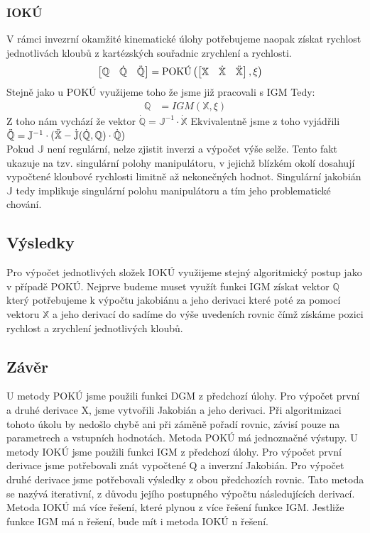 \documentclass{article}
\begin{document}
			\subsubsection{IOKÚ}
				V rámci invezrní okamžité kinematické úlohy potřebujeme naopak získat rychlost jednotlivách kloubů z kartézských souřadnic zrychlení a rychlosti. 
					\begin{align}
							\begin{bmatrix}
								\mathbb{Q} & \dot{\mathbb{Q}} & \Ddot{\mathbb{Q}} \\
							\end{bmatrix} &= \textnormal{POKÚ}\left( \begin{bmatrix}
								\mathbb{X} & \dot{\mathbb{X}} & \Ddot{\mathbb{X}} \\
							\end{bmatrix}, \xi \right)
					\end{align}
				Stejně jako u POKÚ využijeme toho že jsme již pracovali s IGM Tedy:
					\begin{align}
					\mathbb{Q} &= IGM(\mathbb{X},\xi)
					\end{align}
				Z toho nám vychází že vektor $\mathbb{\dot{Q}} = \mathbb{J}^{-1}\cdot\mathbb{\dot{X}}$ 
				Ekvivalentně jsme z toho vyjádřili $\mathbb{\Ddot{Q}} = \mathbb{J}^{-1}\cdot(\mathbb{\Ddot{X}}-\mathbb{\dot{J}}(\mathbb{\dot{Q}},\mathbb{Q})\cdot\mathbb{\dot{Q}})$\\
				Pokud \(\mathbb{J}\) není regulární, nelze zjistit inverzi a výpočet výše selže. Tento fakt ukazuje na tzv. singulární polohy manipulátoru, v jejichž blízkém okolí dosahují vypočtené kloubové rychlosti limitně až nekonečných hodnot. Singulární jakobián \(\mathbb{J}\) tedy implikuje singulární polohu manipulátoru a tím jeho problematické chování.
		\subsection{Výsledky}
			Pro výpočet jednotlivých složek IOKÚ využijeme stejný algoritmický postup jako v případě POKÚ. Nejprve budeme muset využít funkci IGM získat vektor $\mathbb{Q}$   který potřebujeme k výpočtu jakobiánu a jeho derivaci které poté za pomocí vektoru  $\mathbb{X}$  a jeho derivací do sadíme do výše uvedeních rovnic čímž získáme pozici rychlost a zrychlení jednotlivých kloubů.
		\subsection{Závěr}
			U metody POKÚ jsme použili funkci DGM z předchozí úlohy. Pro výpočet první a druhé derivace
			X, jsme vytvořili Jakobián a jeho derivaci. Při algoritmizaci tohoto úkolu by nedošlo chybě ani při
			záměně pořadí rovnic, závisí pouze na parametrech a vstupních hodnotách. Metoda POKÚ má jednoznačné výstupy.
			U metody IOKÚ jsme použili funkci IGM z předchozí úlohy. Pro výpočet první derivace jsme potřebovali znát vypočtené Q a inverzní Jakobián. Pro výpočet druhé derivace jsme potřebovali výsledky z
			obou předchozích rovnic. Tato metoda se nazývá iterativní, z důvodu jejího postupného výpočtu
			následujících derivací. Metoda IOKÚ má více řešení, které plynou z více řešení funkce IGM. Jestliže
			funkce IGM má n řešení, bude mít i metoda IOKÚ n řešení.
	\newpage
\end{document}
